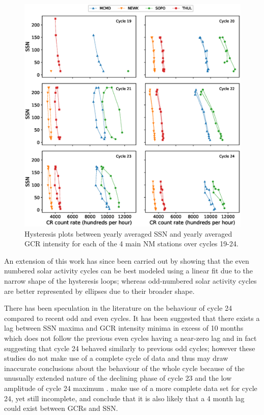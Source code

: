 \begin{figure}
	\includegraphics[width=\columnwidth]{all_hysteresis.eps}
	\caption{Hysteresis plots between yearly averaged SSN and yearly averaged GCR intensity for each of the 4 main NM stations over cycles 19-24.}
	\label{fig:all_hysteresis}
\end{figure}


An extension of this work has since been carried out by \citet{inceoglu_modeling_2014} showing that the even numbered solar activity cycles can be best modeled using a linear fit due to the narrow shape of the hysteresis loops; whereas odd-numbered solar activity cycles are better represented by ellipses due to their broader shape.

There has been speculation in the literature on the behaviour of cycle 24 compared to recent odd and even cycles. It has been suggested that there exists a lag between SSN maxima and GCR intensity minima in excess of 10 months \citep{kane_lags_2014, mishra_study_2016} which does not follow the previous even cycles having a near-zero lag and in fact suggesting that cycle 24 behaved similarly to previous odd cycles; however these studies do not make use of a complete cycle of data and thus may draw inaccurate conclusions about the behaviour of the whole cycle because of the unusually extended nature of the declining phase of cycle 23 and the low amplitude of cycle 24 maximum \citep{broomhall_helioseismic_2017}. \cite{mishra_study_2016} make use of a more complete data set for cycle 24, yet still incomplete, and conclude that it is also likely that a 4 month lag could exist between GCRs and SSN.

